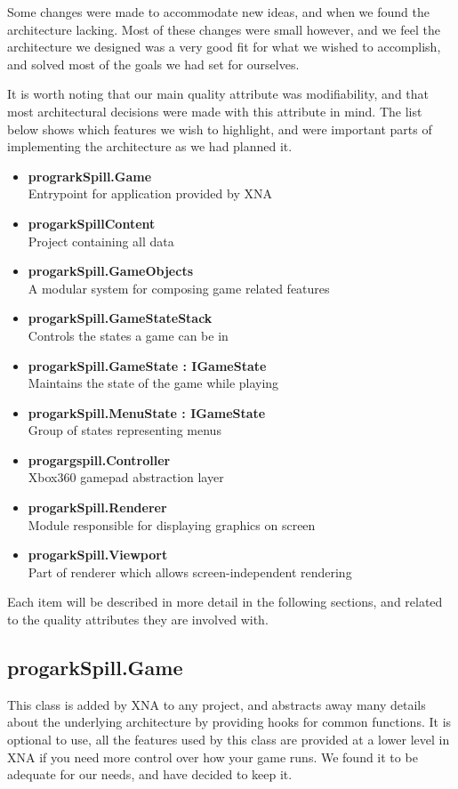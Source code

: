 Some changes were made to accommodate new ideas, and when we found the
architecture lacking. Most of these changes were small however, and we feel
the architecture we designed was a very good fit for what we wished to
accomplish, and solved most of the goals we had set for ourselves.

It is worth noting that our main quality attribute was modifiability, and
that most architectural decisions were made with this attribute in mind.
The list below shows which features we wish to highlight, and were important
parts of implementing the architecture as we had planned it.

\begin{itemize}
	\item \textbf{prograrkSpill.Game} \\
	      Entrypoint for application provided by XNA
	\item \textbf{progarkSpillContent} \\
	      Project containing all data
  	\item \textbf{progarkSpill.GameObjects} \\
  	      A modular system for composing game related features
  	\item \textbf{progarkSpill.GameStateStack} \\
  	      Controls the states a game can be in		
	\item \textbf{progarkSpill.GameState : IGameState} \\
	      Maintains the state of the game while playing
	\item \textbf{progarkSpill.MenuState : IGameState} \\
	      Group of states representing menus
	\item \textbf{progargspill.Controller} \\
	      Xbox360 gamepad abstraction layer
	\item \textbf{progarkSpill.Renderer} \\
	      Module responsible for displaying graphics on screen
	\item \textbf{progarkSpill.Viewport} \\
	      Part of renderer which allows screen-independent rendering
\end{itemize}

Each item will be described in more detail in the following sections, and
related to the quality attributes they are involved with.

\subsection{progarkSpill.Game}
This class is added by XNA to any project, and abstracts away many details
about the underlying architecture by providing hooks for common functions.
It is optional to use, all the features used by this class are provided at
a lower level in XNA if you need more control over how your game runs. We
found it to be adequate for our needs, and have decided to keep it.

